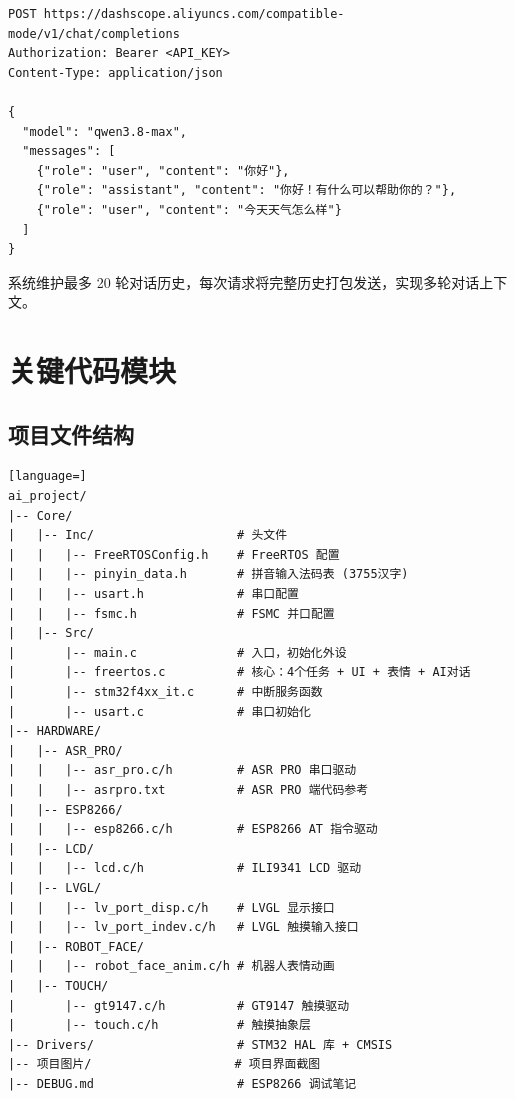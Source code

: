 \documentclass[12pt,a4paper]{ctexart}
\begin{document}
\begin{lstlisting}
POST https://dashscope.aliyuncs.com/compatible-mode/v1/chat/completions
Authorization: Bearer <API_KEY>
Content-Type: application/json

{
  "model": "qwen3.8-max",
  "messages": [
    {"role": "user", "content": "你好"},
    {"role": "assistant", "content": "你好！有什么可以帮助你的？"},
    {"role": "user", "content": "今天天气怎么样"}
  ]
}
\end{lstlisting}

系统维护最多 20 轮对话历史，每次请求将完整历史打包发送，实现多轮对话上下文。

\section{关键代码模块}

\subsection{项目文件结构}

\begin{lstlisting}[language=]
ai_project/
|-- Core/
|   |-- Inc/                    # 头文件
|   |   |-- FreeRTOSConfig.h    # FreeRTOS 配置
|   |   |-- pinyin_data.h       # 拼音输入法码表 (3755汉字)
|   |   |-- usart.h             # 串口配置
|   |   |-- fsmc.h              # FSMC 并口配置
|   |-- Src/
|       |-- main.c              # 入口，初始化外设
|       |-- freertos.c          # 核心：4个任务 + UI + 表情 + AI对话
|       |-- stm32f4xx_it.c      # 中断服务函数
|       |-- usart.c             # 串口初始化
|-- HARDWARE/
|   |-- ASR_PRO/
|   |   |-- asr_pro.c/h         # ASR PRO 串口驱动
|   |   |-- asrpro.txt          # ASR PRO 端代码参考
|   |-- ESP8266/
|   |   |-- esp8266.c/h         # ESP8266 AT 指令驱动
|   |-- LCD/
|   |   |-- lcd.c/h             # ILI9341 LCD 驱动
|   |-- LVGL/
|   |   |-- lv_port_disp.c/h    # LVGL 显示接口
|   |   |-- lv_port_indev.c/h   # LVGL 触摸输入接口
|   |-- ROBOT_FACE/
|   |   |-- robot_face_anim.c/h # 机器人表情动画
|   |-- TOUCH/
|       |-- gt9147.c/h          # GT9147 触摸驱动
|       |-- touch.c/h           # 触摸抽象层
|-- Drivers/                    # STM32 HAL 库 + CMSIS
|-- 项目图片/                    # 项目界面截图
|-- DEBUG.md                    # ESP8266 调试笔记
\end{lstlisting}
\end{document}
